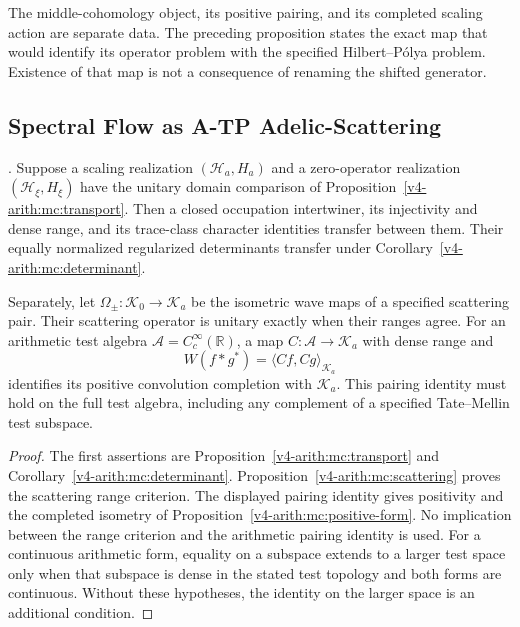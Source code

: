 \begin{remark}
\label{v4-arith:w9-r4:rem:deninger-renames}
The middle-cohomology object, its positive pairing, and its completed
scaling action are separate data. The preceding proposition states
the exact map that would identify its operator problem with the
specified Hilbert--P\'olya problem. Existence of that map is not
a consequence of renaming the shifted generator.
\end{remark}

\subsection{Spectral Flow as A-TP Adelic-Scattering}
\label{v4-arith:w9-r4:placement:atp}

\begin{proposition}
\label{v4-arith:w9-r4:prop:spectral-flow-eq-atp}
\ClaimStatusProvedHereConditional. Suppose a scaling realization
$(\mathcal H_a,H_a)$ and a zero-operator realization
$(\mathcal H_\xi,H_\xi)$ have the unitary domain comparison of
Proposition~\ref{v4-arith:mc:transport}.
Then a closed occupation intertwiner, its injectivity and dense range,
and its trace-class character identities transfer between them.
Their equally normalized regularized determinants transfer under
Corollary~\ref{v4-arith:mc:determinant}.

Separately, let $\Omega_\pm:\mathcal K_0\to\mathcal K_a$ be the
isometric wave maps of a specified scattering pair. Their scattering
operator is unitary exactly when their ranges agree.
For an arithmetic test algebra $\mathscr A=C_c^\infty(\mathbb R)$,
a map $C:\mathscr A\to\mathcal K_a$ with dense range and
\[
 W(f*g^*)=\langle Cf,Cg\rangle_{\mathcal K_a}
\]
identifies its positive convolution completion with $\mathcal K_a$.
This pairing identity must hold on the full test algebra, including
any complement of a specified Tate--Mellin test subspace.
\end{proposition}
\begin{proof}
The first assertions are Proposition~\ref{v4-arith:mc:transport}
and Corollary~\ref{v4-arith:mc:determinant}.
Proposition~\ref{v4-arith:mc:scattering} proves the scattering
range criterion. The displayed pairing identity gives positivity
and the completed isometry of
Proposition~\ref{v4-arith:mc:positive-form}.
No implication between the range criterion and the arithmetic
pairing identity is used. For a continuous arithmetic form, equality
on a subspace extends to a larger test space only when that subspace
is dense in the stated test topology and both forms are continuous.
Without these hypotheses, the identity on the larger space is
an additional condition.
\end{proof}

